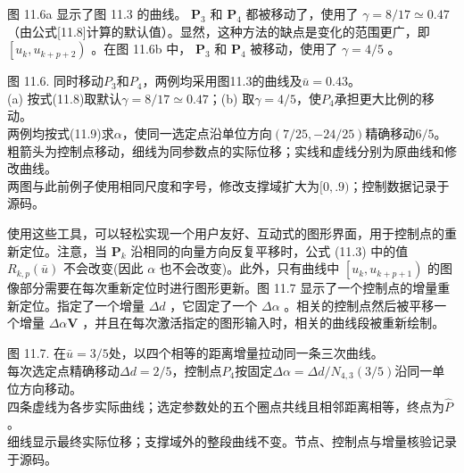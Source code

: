 \documentclass[../main.tex]{subfiles}
\begin{document}
图 11.6a 显示了图 11.3 的曲线。 \({\mathbf{P}}_{3}\) 和 \({\mathbf{P}}_{4}\) 都被移动了，使用了 \(\gamma=8/17\simeq0.47\)（由公式[11.8]计算的默认值）。显然，这种方法的缺点是变化的范围更广，即 \(\left\lbrack  {{u}_{k},{u}_{k + p + 2}}\right)\) 。在图 11.6b 中， \({\mathbf{P}}_{3}\) 和 \({\mathbf{P}}_{4}\) 被移动，使用了 \(\gamma  = 4/5\) 。

\begin{center}
\begin{minipage}{26cm}
\vspace*{.6\baselineskip}
\centering
{}
\par\smallskip
图 11.6. 同时移动$P_3$和$P_4$，两例均采用图11.3的曲线及$\bar u=0.43$。\\
(a) 按式(11.8)取默认$\gamma=8/17\simeq0.47$；(b) 取$\gamma=4/5$，使$P_4$承担更大比例的移动。\\
两例均按式(11.9)求$\alpha$，使同一选定点沿单位方向$(7/25,-24/25)$精确移动$6/5$。\\
粗箭头为控制点移动，细线为同参数点的实际位移；实线和虚线分别为原曲线和修改曲线。\\
两图与此前例子使用相同尺度和字号，修改支撑域扩大为$[0,.9)$；控制数据记录于源码。
\end{minipage}
\end{center}

使用这些工具，可以轻松实现一个用户友好、互动式的图形界面，用于控制点的重新定位。注意，当 \({\mathbf{P}}_{k}\) 沿相同的向量方向反复平移时，公式 (11.3) 中的值 \({R}_{k,p}\left( \bar{u}\right)\) 不会改变(因此 \(\alpha\) 也不会改变)。此外，只有曲线中 \(\left\lbrack  {{u}_{k},{u}_{k + p + 1}}\right)\) 的图像部分需要在每次重新定位时进行图形更新。图 11.7 显示了一个控制点的增量重新定位。指定了一个增量 \({\Delta d}\) ，它固定了一个 \({\Delta \alpha }\) 。相关的控制点然后被平移一个增量 \({\Delta \alpha }\mathbf{V}\) ，并且在每次激活指定的图形输入时，相关的曲线段被重新绘制。



\begin{center}
\begin{minipage}{26cm}
\vspace*{.6\baselineskip}
\centering
{}
\par\smallskip
图 11.7. 在$\bar u=3/5$处，以四个相等的距离增量拉动同一条三次曲线。\\
每次选定点精确移动$\Delta d=2/5$，控制点$P_4$按固定$\Delta\alpha=\Delta d/N_{4,3}(3/5)$沿同一单位方向移动。\\
四条虚线为各步实际曲线；选定参数处的五个圈点共线且相邻距离相等，终点为$\widehat P$。\\
细线显示最终实际位移；支撑域外的整段曲线不变。节点、控制点与增量核验记录于源码。
\end{minipage}
\end{center}
\end{document}
